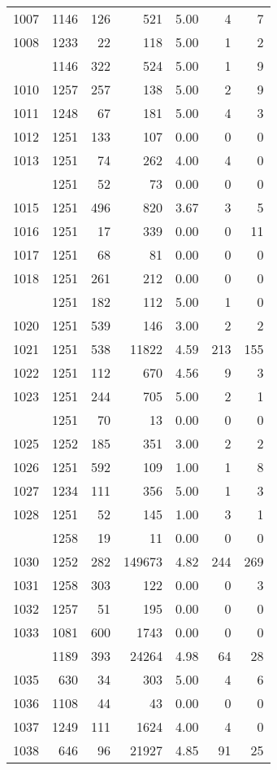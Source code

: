 \documentclass[
]{article}
\begin{document}
\begin{table}
\begin{tabular}[t]{lrrrrrr}
1007 & 1146 & 126 & 521 & 5.00 & 4 & 7\\
1008 & 1233 & 22 & 118 & 5.00 & 1 & 2\\
\addlinespace
1009 & 1146 & 322 & 524 & 5.00 & 1 & 9\\
1010 & 1257 & 257 & 138 & 5.00 & 2 & 9\\
1011 & 1248 & 67 & 181 & 5.00 & 4 & 3\\
1012 & 1251 & 133 & 107 & 0.00 & 0 & 0\\
1013 & 1251 & 74 & 262 & 4.00 & 4 & 0\\
\addlinespace
1014 & 1251 & 52 & 73 & 0.00 & 0 & 0\\
1015 & 1251 & 496 & 820 & 3.67 & 3 & 5\\
1016 & 1251 & 17 & 339 & 0.00 & 0 & 11\\
1017 & 1251 & 68 & 81 & 0.00 & 0 & 0\\
1018 & 1251 & 261 & 212 & 0.00 & 0 & 0\\
\addlinespace
1019 & 1251 & 182 & 112 & 5.00 & 1 & 0\\
1020 & 1251 & 539 & 146 & 3.00 & 2 & 2\\
1021 & 1251 & 538 & 11822 & 4.59 & 213 & 155\\
1022 & 1251 & 112 & 670 & 4.56 & 9 & 3\\
1023 & 1251 & 244 & 705 & 5.00 & 2 & 1\\
\addlinespace
1024 & 1251 & 70 & 13 & 0.00 & 0 & 0\\
1025 & 1252 & 185 & 351 & 3.00 & 2 & 2\\
1026 & 1251 & 592 & 109 & 1.00 & 1 & 8\\
1027 & 1234 & 111 & 356 & 5.00 & 1 & 3\\
1028 & 1251 & 52 & 145 & 1.00 & 3 & 1\\
\addlinespace
1029 & 1258 & 19 & 11 & 0.00 & 0 & 0\\
1030 & 1252 & 282 & 149673 & 4.82 & 244 & 269\\
1031 & 1258 & 303 & 122 & 0.00 & 0 & 3\\
1032 & 1257 & 51 & 195 & 0.00 & 0 & 0\\
1033 & 1081 & 600 & 1743 & 0.00 & 0 & 0\\
\addlinespace
1034 & 1189 & 393 & 24264 & 4.98 & 64 & 28\\
1035 & 630 & 34 & 303 & 5.00 & 4 & 6\\
1036 & 1108 & 44 & 43 & 0.00 & 0 & 0\\
1037 & 1249 & 111 & 1624 & 4.00 & 4 & 0\\
1038 & 646 & 96 & 21927 & 4.85 & 91 & 25\\

\end{tabular}
\end{table}
\end{document}
